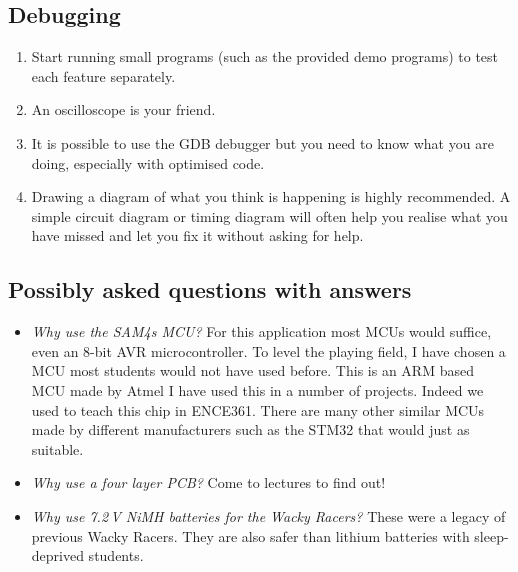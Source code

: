 \documentclass[11pt, a4paper]{article}
\begin{document}
\subsection{Debugging}

\begin{enumerate}
\item Start running small programs (such as the provided demo
  programs) to test each feature separately.

\item An oscilloscope is your friend.

\item It is possible to use the GDB debugger but you need to know what
  you are doing, especially with optimised code.

\item Drawing a diagram of what you think is happening is highly recommended. A
simple circuit diagram or timing diagram will often help you realise what you
have missed and let you fix it without asking for help.

\end{enumerate}


\subsection{Possibly asked questions with answers}

\begin{itemize}
\item \emph{Why use the SAM4s MCU?}  For this application most MCUs
  would suffice, even an 8-bit AVR microcontroller.  To level the
  playing field, I have chosen a MCU most students would not have used
  before.  This is an ARM based MCU made by Atmel I have used this in
  a number of projects.  Indeed we used to teach this chip in ENCE361.
  There are many other similar MCUs made by different manufacturers
  such as the STM32 that would just as suitable.

\item \emph{Why use a four layer PCB?}  Come to lectures to find out!

\item \emph{Why use 7.2\,V NiMH batteries for the Wacky Racers?}
  These were a legacy of previous Wacky Racers.  They are also safer
  than lithium batteries with sleep-deprived students.


\end{itemize}
\end{document}

